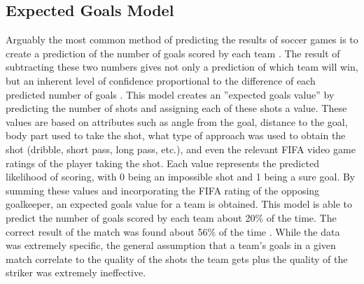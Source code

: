 \documentclass[sigconf]{acmart}
\begin{document}
\subsection{Expected Goals Model}
Arguably the most common method of predicting the results of soccer games is to create a prediction of the number of goals scored by each team . The result of subtracting these two numbers gives not only a prediction of which team will win, but an inherent level of confidence proportional to the difference of each predicted number of goals \cite{ExpectedGoals}. This model creates an ''expected goals value'' by predicting the number of shots and assigning each of these shots a value. These values are based on attributes such as angle from the goal, distance to the goal, body part used to take the shot, what type of approach was used to obtain the shot (dribble, short pass, long pass, etc.), and even the relevant FIFA video game ratings of the player taking the shot. Each value represents the predicted likelihood of scoring, with 0 being an impossible shot and 1 being a sure goal. By summing these values and incorporating the FIFA rating of the opposing goalkeeper, an expected goals value for a team is obtained. This model is able to predict the number of goals scored by each team about 20\% of the time. The correct result of the match was found about 56\% of the time \cite{ExpectedGoals}. While the data was extremely specific, the general assumption that a team's goals in a given match correlate to the quality of the shots the team gets plus the quality of the striker was extremely ineffective. \cite{paper2}
\end{document}

